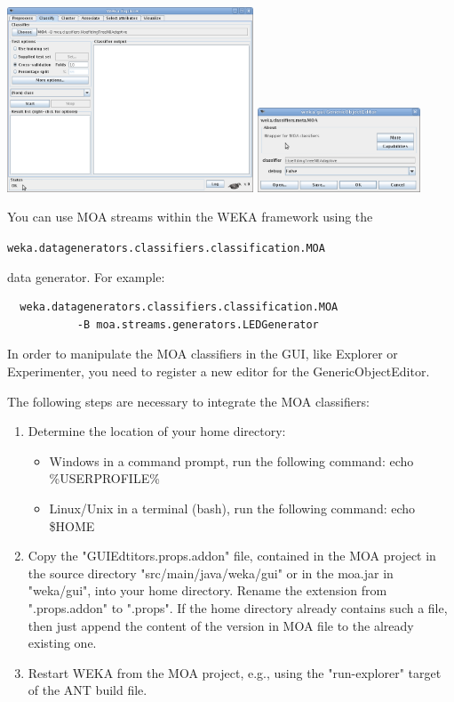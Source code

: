 \documentclass[a4paper,12pt,twoside]{book}
\begin{document}
\begin{center}
\includegraphics[height=5.5cm]{images/Screenshot-WekaE.png}
\includegraphics[height=2.5cm]{images/Screenshot-weka.png}
\end{center}

You can use MOA streams within the WEKA framework using the 

\texttt{weka.datagenerators.classifiers.classification.MOA}
\vspace{.2cm}

data generator.
For example:
\begin{footnotesize}\begin{verbatim}
  weka.datagenerators.classifiers.classification.MOA 
           -B moa.streams.generators.LEDGenerator
\end{verbatim}\end{footnotesize}

In order to manipulate the MOA classifiers in the GUI, like Explorer or
Experimenter, you need to register a new editor for the GenericObjectEditor.

The following steps are necessary to integrate the MOA classifiers:
\begin{enumerate}
 \item Determine the location of your home directory:
\begin{itemize}
 \item  Windows
     in a command prompt, run the following command:
       echo \%USERPROFILE\%
 \item Linux/Unix
     in a terminal (bash), run the following command:
       echo \$HOME
\end{itemize}
\item Copy the "GUIEdtitors.props.addon" file, contained in the MOA project in the 
   source directory "src/main/java/weka/gui" or in the moa.jar in "weka/gui",
   into your home directory. Rename the extension from ".props.addon" to 
   ".props". If the home directory already contains such a file, then just 
   append the content of the version in MOA file to the already existing one.

\item Restart WEKA from the MOA project, e.g., using the "run-explorer" target of
   the ANT build file.
\end{enumerate}   
\end{document}
